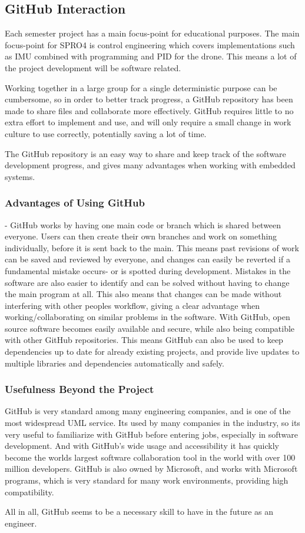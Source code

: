 \subsection{GitHub Interaction}
Each semester project has a main focus-point for educational purposes. The main focus-point for SPRO4 is control engineering which covers implementations such as IMU combined with programming and PID for the drone. This means a lot of the project development will be software related.

Working together in a large group for a single deterministic purpose can be cumbersome, so in order to better track progress, a GitHub repository has been made to share files and collaborate more effectively. GitHub requires little to no extra effort to implement and use, and will only require a small change in work culture to use correctly, potentially saving a lot of time.

 The GitHub repository is an easy way to share and keep track of the software development progress, and gives many advantages when working with embedded systems. 

\subsubsection{Advantages of Using GitHub}
- GitHub works by having one main code or branch which is shared between everyone. Users can then create their own branches and work on something individually, before it is sent back to the main. This means past revisions of work can be saved and reviewed by everyone, and changes can easily be reverted if a fundamental mistake occurs- or is spotted during development. Mistakes in the software are also easier to identify and can be solved without having to change the main program at all. This also means that changes can be made without interfering with other peoples workflow, giving a clear advantage when working/collaborating on similar problems in the software.\cite{benefitsGithub}
With GitHub, open source software becomes easily available and secure, while also being compatible with other GitHub repositories. This means GitHub can also be used to keep dependencies up to date for already existing projects, and provide live updates to multiple libraries and dependencies automatically and safely. \cite{githubaccelerates}

\subsubsection{Usefulness Beyond the Project}
GitHub is very standard among many engineering companies, and is one of the most widespread UML service. Its used by many companies in the industry, so its very useful to familiarize with GitHub before entering jobs, especially in software development.
 And with GitHub's wide usage and accessibility it has quickly become the worlds largest software collaboration tool in the world with over 100 million developers.\cite{WhoGithub} GitHub is also owned by Microsoft, and works with Microsoft programs, which is very standard for many work environments, providing high  compatibility.

All in all, GitHub seems to be a necessary skill to have in the future as an engineer.

